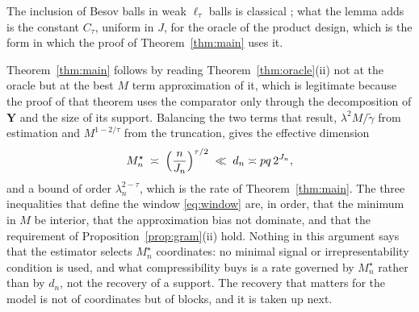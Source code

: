 \documentclass[12pt]{article} %
\theoremstyle{definition}
\newcommand{\pen}{\lambda}
\newcommand{\penn}{\lambda_{n}}
\newcommand{\bY}{\mathbf{Y}}
\newcommand{\gtil}{\widetilde{\gamma}}
\newcommand{\Mstar}{M^{\star}}
\begin{document}
\textcolor{colR1}{The inclusion of Besov balls in weak $\ell_\tau$ balls is classical
\citep[Proposition~9.15]{johnstone2019gaussian}; what the lemma adds is the
constant $C_\tau$, uniform in $J$, for the oracle of the product design, which
is the form in which the proof of Theorem~\ref{thm:main} uses it.}

Theorem~\ref{thm:main} follows by reading Theorem~\ref{thm:oracle}(ii) not at
the oracle but at the best $M$ term approximation of it, which is legitimate
because the proof of that theorem uses the comparator only through the
decomposition of $\bY$ and the size of its support. Balancing the two terms
that result, $\pen^{2}M/\gtil$ from estimation and
$M^{1-2/\tau}$ from the truncation, gives the effective dimension
\begin{equation}
  \label{eq:Mstar}
  \Mstar_n \;\asymp\; \Bigl(\frac{n}{J_n}\Bigr)^{\tau/2}
  \;\ll\; d_n \asymp pq\,2^{J_n},
\end{equation}
and a bound of order $\penn^{2-\tau}$, which is the rate of
Theorem~\ref{thm:main}. The three inequalities that define the window
\eqref{eq:window} are, in order, that the minimum in $M$ be interior, that the
\textcolor{colR1}{approximation bias} not dominate, and that the requirement of
Proposition~\ref{prop:gram}(ii) hold. Nothing in this argument says that the
estimator selects $\Mstar_n$ coordinates: no minimal signal or
irrepresentability condition is used, and what compressibility buys is a rate
governed by $\Mstar_n$ rather than by $d_n$, not the recovery of a support.
\textcolor{colR1}{The recovery that matters for the model is not of coordinates
but of blocks, and it is taken up next.}
\end{document}
